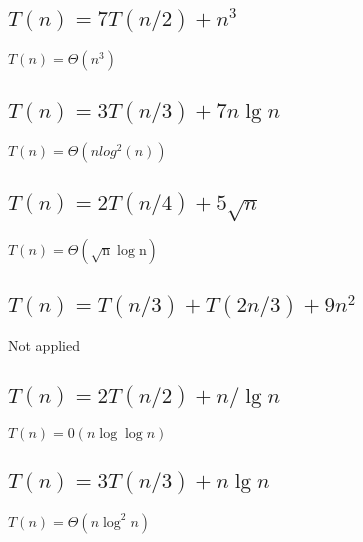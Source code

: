 \documentclass[a4paper]{article}
\begin{document}
\subsection{$T(n)=7 T(n / 2)+n^3$}
$T(n)=\Theta(n^3)$
\subsection{$T(n)=3 T(n / 3)+7 n \lg n$}
$T(n)=\Theta(nlog^2(n))$
\subsection{$T(n)=2 T(n / 4)+5 \sqrt{n}$}
$T(n)=\Theta(\sqrt{\mathrm{n}} \log \mathrm{n})$
\subsection{$T(n)=T(n / 3)+T(2 n / 3)+9 n^2$}
Not applied
\subsection{$T(n)=2 T(n / 2)+n / \lg n$}
$T(n)=0(n \log \log n)$
\subsection{$T(n)=3 T(n / 3)+n \lg n$}
$T(n)=\Theta(n \log ^2 n)$
\end{document}
